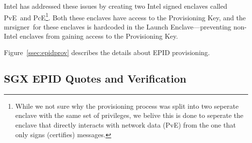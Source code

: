 \documentclass[10pt, letterpaper]{article}
\newcommand{\mrsigner}{\textsf{mrsigner}}
\newcommand{\pve}{\textsf{PvE}}
\newcommand{\pce}{\textsf{PcE}}
\begin{document}
  Intel has addressed these issues by creating two Intel signed
  enclaves called \pve\ and \pce\footnote{While we not sure why the
    provisioning process was split into two seperate enclave with the
    same set of privileges, we belive this is done to seperate the
    enclave that directly interacts with network data (\pve) from the
    one that only signs (certifies) messages.}. Both these enclaves
  have access to the Provisioning Key, and the \mrsigner\ for these
  enclaves is hardcoded in the \textsf{Launch Enclave}---preventing
  non-Intel enclaves from gaining access to the Provisioning Key.

  Figure~\ref{ssec:epidprov} describes the details about EPID
  provisioning.

  \subsection{SGX EPID Quotes and Verification}
 


\end{document}
